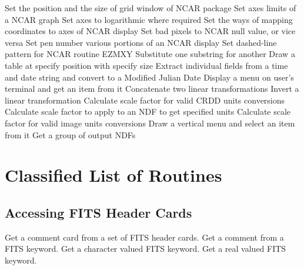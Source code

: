   {Set the position and the size of grid window of NCAR package}
  {Set axes limits of a NCAR graph}
  {Set axes to logarithmic where required}
  {Set the ways of mapping coordinates to axes of NCAR display}
  {Set bad pixels to NCAR null value, or vice versa}
  {Set pen number various portions of an NCAR display}
  {Set dashed-line pattern for NCAR routine EZMXY}
  {Substitute one substring for another}
  {Draw a table at specify position with specify size}
  {Extract individual fields from a time and date string and convert
   to a Modified Julian Date}
  {Display a menu on user's terminal and get an item from it}
  {Concatenate two linear transformations}
  {Invert a linear transformation}
  {Calculate scale factor for valid CRDD units conversions}
  {Calculate scale factor to apply to an NDF to get specified units}
  {Calculate scale factor for valid image units conversions}
  {Draw a vertical menu and select an item from it}
  {Get a group of output NDFs}


\section{Classified List of Routines}

\subsection {Accessing FITS Header Cards}
  {Get a comment card from a set of FITS header cards.}
  {Get a comment from a FITS keyword.}
  {Get a character valued FITS keyword.}
  {Get a real valued FITS keyword.}


